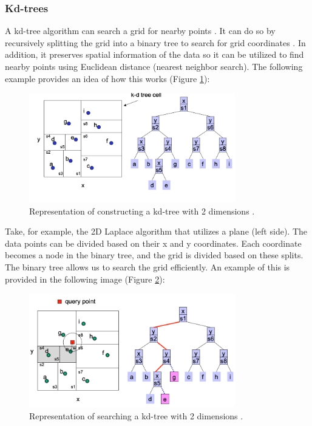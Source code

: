 \subsubsection*{Kd-trees} \label{theory:kd-trees}
A kd-tree algorithm can search a grid for nearby points \citep{bentley_multidimensional_1975}.
It can do so by recursively splitting the grid into a binary tree to search for grid coordinates \citep{washington_k-d_2002}.
In addition, it preserves spatial information of the data so it can be utilized to find nearby points using Euclidean distance (nearest neighbor search).
The following example provides an idea of how this works (Figure \ref{fig:kd-tree-theory}):
\begin{figure}[H]
  \includegraphics[width=0.8\textwidth]{TheorethicalFramework/ND-Laplace/Images/kd-tree-part1.png}
  \caption{Representation of constructing a kd-tree with 2 dimensions \citep{washington_k-d_2002}.}
  \label{fig:kd-tree-theory}
\end{figure}
Take, for example, the 2D Laplace algorithm that utilizes a plane (left side).
The data points can be divided based on their x and y coordinates.
Each coordinate becomes a node in the binary tree, and the grid is divided based on these splits.
The binary tree allows us to search the grid efficiently.
An example of this is provided in the following image (Figure \ref{fig:kd-tree-searching-theory}):
\begin{figure}[H]
  \includegraphics[width=0.8\textwidth]{TheorethicalFramework/ND-Laplace/Images/kd-tree-part2.png}
  \caption{Representation of searching a kd-tree with 2 dimensions \citep{washington_k-d_2002}.}
  \label{fig:kd-tree-searching-theory}
\end{figure}
